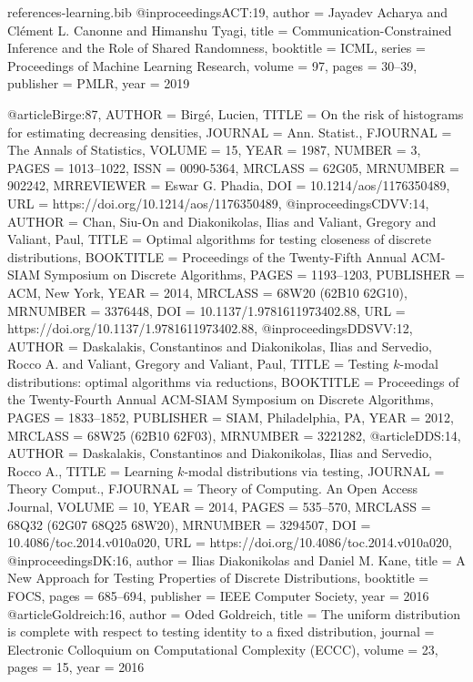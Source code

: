 \documentclass[11pt]{article}
\begin{document}
\begin{filecontents}{references-learning.bib}
@inproceedings{ACT:19,
  author    = {Jayadev Acharya and
               Cl{\'{e}}ment L. Canonne and
               Himanshu Tyagi},
  title     = {Communication-Constrained Inference and the Role of Shared Randomness},
  booktitle = {{ICML}},
  series    = {Proceedings of Machine Learning Research},
  volume    = {97},
  pages     = {30--39},
  publisher = {{PMLR}},
  year      = {2019}
}

@article{Birge:87,
    AUTHOR = {Birg\'{e}, Lucien},
     TITLE = {On the risk of histograms for estimating decreasing densities},
   JOURNAL = {Ann. Statist.},
  FJOURNAL = {The Annals of Statistics},
    VOLUME = {15},
      YEAR = {1987},
    NUMBER = {3},
     PAGES = {1013--1022},
      ISSN = {0090-5364},
   MRCLASS = {62G05},
  MRNUMBER = {902242},
MRREVIEWER = {Eswar G. Phadia},
       DOI = {10.1214/aos/1176350489},
       URL = {https://doi.org/10.1214/aos/1176350489},
}
@inproceedings{CDVV:14,
    AUTHOR = {Chan, Siu-On and Diakonikolas, Ilias and Valiant, Gregory and
              Valiant, Paul},
     TITLE = {Optimal algorithms for testing closeness of discrete
              distributions},
 BOOKTITLE = {Proceedings of the {T}wenty-{F}ifth {A}nnual {ACM}-{SIAM}
              {S}ymposium on {D}iscrete {A}lgorithms},
     PAGES = {1193--1203},
 PUBLISHER = {ACM, New York},
      YEAR = {2014},
   MRCLASS = {68W20 (62B10 62G10)},
  MRNUMBER = {3376448},
       DOI = {10.1137/1.9781611973402.88},
       URL = {https://doi.org/10.1137/1.9781611973402.88},
}
@inproceedings{DDSVV:12,
    AUTHOR = {Daskalakis, Constantinos and Diakonikolas, Ilias and Servedio,
              Rocco A. and Valiant, Gregory and Valiant, Paul},
     TITLE = {Testing {$k$}-modal distributions: optimal algorithms via
              reductions},
 BOOKTITLE = {Proceedings of the {T}wenty-{F}ourth {A}nnual {ACM}-{SIAM}
              {S}ymposium on {D}iscrete {A}lgorithms},
     PAGES = {1833--1852},
 PUBLISHER = {SIAM, Philadelphia, PA},
      YEAR = {2012},
   MRCLASS = {68W25 (62B10 62F03)},
  MRNUMBER = {3221282},
}
@article{DDS:14,
    AUTHOR = {Daskalakis, Constantinos and Diakonikolas, Ilias and Servedio,
              Rocco A.},
     TITLE = {Learning {$k$}-modal distributions via testing},
   JOURNAL = {Theory Comput.},
  FJOURNAL = {Theory of Computing. An Open Access Journal},
    VOLUME = {10},
      YEAR = {2014},
     PAGES = {535--570},
   MRCLASS = {68Q32 (62G07 68Q25 68W20)},
  MRNUMBER = {3294507},
       DOI = {10.4086/toc.2014.v010a020},
       URL = {https://doi.org/10.4086/toc.2014.v010a020},
}
@inproceedings{DK:16,
  author    = {Ilias Diakonikolas and
               Daniel M. Kane},
  title     = {A New Approach for Testing Properties of Discrete Distributions},
  booktitle = {{FOCS}},
  pages     = {685--694},
  publisher = {{IEEE} Computer Society},
  year      = {2016}
}
@article{Goldreich:16,
  author    = {Oded Goldreich},
  title     = {The uniform distribution is complete with respect to testing identity
               to a fixed distribution},
  journal   = {Electronic Colloquium on Computational Complexity {(ECCC)}},
  volume    = {23},
  pages     = {15},
  year      = {2016}
}


\end{filecontents}
\end{document}
